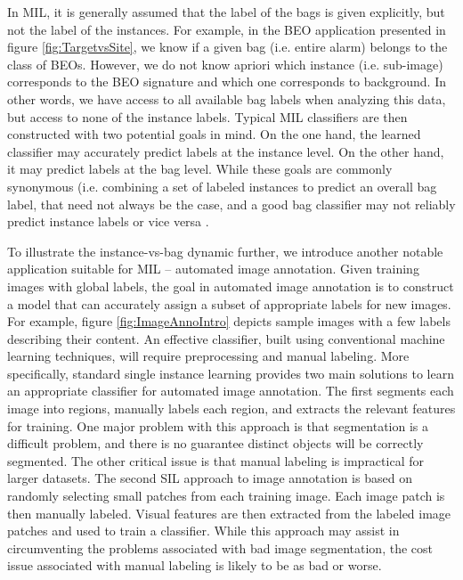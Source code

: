 \documentclass[12pt,dvips]{report}
\numberwithin{equation}{section}
\begin{document}
In MIL, it is generally assumed that the label of the bags is given
explicitly, but not the label of the instances. For example, in the
BEO application presented in figure \ref{fig:TargetvsSite},
we know if a given bag (i.e. entire alarm) belongs to the class of BEOs. However,
we do not know apriori which instance (i.e. sub-image) corresponds to the BEO signature
and which one corresponds to background. In other words, we have access
to all available bag labels when analyzing this data, but access
to none of the instance labels. Typical MIL classifiers are then constructed with two potential goals in mind. On the one hand, the learned classifier may accurately predict labels at  the instance level.  On the other hand, it may predict labels at the bag level.  While these goals are commonly synonymous (i.e. combining a set of labeled instances to predict an overall bag label, that need not always be the case, and a good bag classifier may not reliably predict instance labels or vice versa \cite{amor13,chap14}.

To illustrate the instance-vs-bag dynamic further, we introduce another
notable application suitable for MIL -- automated image annotation.
Given training images with global labels, the goal in automated image
annotation is to construct a model that can accurately assign a subset
of appropriate labels for new images. For example, figure \ref{fig:ImageAnnoIntro} depicts
sample images with a few labels describing their content.  An effective classifier, built using conventional machine learning techniques, will require preprocessing and manual labeling.  More specifically, standard single instance learning provides two main solutions to learn an appropriate
classifier for automated image annotation. The first \cite{saber1997region,chang2003bayesimage,yang2006cvpr} segments
each image into regions, manually labels each region, and extracts the
relevant features for training. One major problem with this approach
is that segmentation is a difficult problem, and there is no guarantee
distinct objects will be correctly segmented. The other critical issue is that manual labeling is impractical for larger datasets. The second SIL approach to image annotation \cite{zhang2010random,yang2006cvpr} is based on randomly selecting small patches from each training image.  Each image patch is then manually labeled.  Visual features are then extracted from the labeled image patches and used to train a classifier.  While this approach may assist in circumventing the problems associated with bad image segmentation, the cost issue associated with manual labeling is likely to be as bad or worse.
\end{document}
